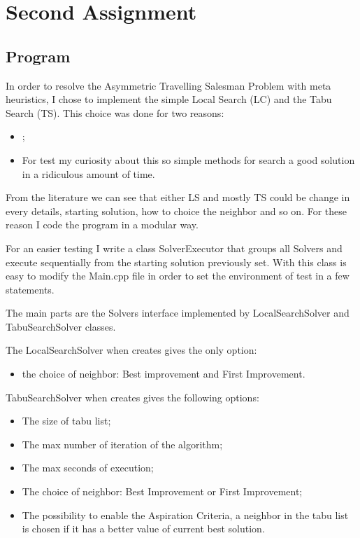 \section{Second Assignment}

\subsection{Program}
	In order to resolve the Asymmetric Travelling Salesman Problem with meta heuristics, I chose to implement the simple Local Search (LC) and the Tabu Search (TS). This choice was done for two reasons: 
	\begin{itemize}
		\item ;
		\item For test my curiosity about this so simple methods for search a good solution in a ridiculous amount of time.
	\end{itemize}

	From the literature we can see that either LS and mostly TS could be change in every details, starting solution, how to choice the neighbor and so on. For these reason I code the program in a modular way.
	
	For an easier testing I write a class SolverExecutor that groups all Solvers and execute sequentially from the starting solution previously set. With this class is easy to modify the Main.cpp file in order to set the environment of test in a few statements.
	
	The main parts are the Solvers interface implemented by LocalSearchSolver and TabuSearchSolver classes. 
	
	The LocalSearchSolver when creates gives the only option:
	\begin{itemize}
		\item the choice of neighbor: Best improvement and First Improvement.
	\end{itemize}
	
	TabuSearchSolver when creates gives the following options:
	\begin{itemize}
		\item The size of tabu list;
		\item The max number of iteration of the algorithm;
		\item The max seconds of execution;
		\item The choice of neighbor: Best Improvement or First Improvement;
		\item The possibility to enable the Aspiration Criteria, a neighbor in the tabu list is chosen if it has a better value of current best solution.
	\end{itemize}

